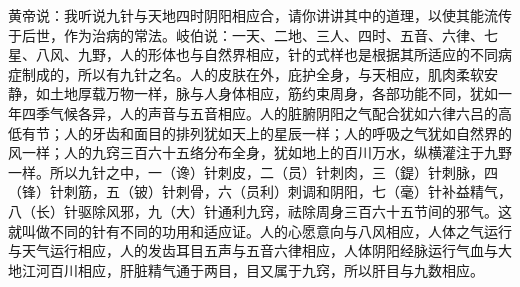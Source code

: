 \documentclass[a4paper,12pt,UTF8,twoside]{ctexbook}
\begin{document}
黄帝说：我听说九针与天地四时阴阳相应合，请你讲讲其中的道理，以使其能流传于后世，作为治病的常法。岐伯说：一天、二地、三人、四时、五音、六律、七星、八风、九野，人的形体也与自然界相应，针的式样也是根据其所适应的不同病症制成的，所以有九针之名。人的皮肤在外，庇护全身，与天相应，肌肉柔软安静，如土地厚载万物一样，脉与人身体相应，筋约束周身，各部功能不同，犹如一年四季气候各异，人的声音与五音相应。人的脏腑阴阳之气配合犹如六律六吕的高低有节；人的牙齿和面目的排列犹如天上的星辰一样；人的呼吸之气犹如自然界的风一样；人的九窍三百六十五络分布全身，犹如地上的百川万水，纵横灌注于九野一样。所以九针之中，一（谗）针刺皮，二（员）针刺肉，三（鍉）针刺脉，四（锋）针刺筋，五（铍）针刺骨，六（员利）刺调和阴阳，七（毫）针补益精气，八（长）针驱除风邪，九（大）针通利九窍，祛除周身三百六十五节间的邪气。这就叫做不同的针有不同的功用和适应证。人的心愿意向与八风相应，人体之气运行与天气运行相应，人的发齿耳目五声与五音六律相应，人体阴阳经脉运行气血与大地江河百川相应，肝脏精气通于两目，目又属于九窍，所以肝目与九数相应。
\end{document}
